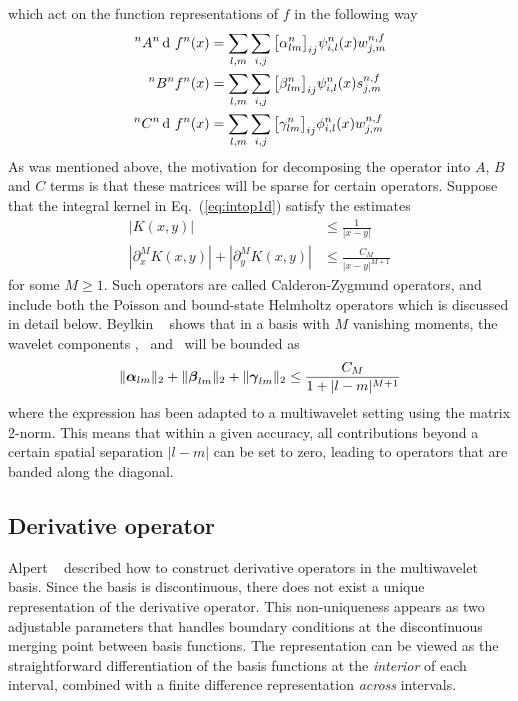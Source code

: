 which act on the function representations of $f$ in the following way
\begin{align}
    \label{eq:Aact}
    \A{n}{n}\waveletrep{f}{n}(x) &= \sum_{l,m} \sum_{i,j}
	\big[\alpha^n_{lm}\big]_{ij}
        \wavelet^n_{i,l}(x) 
	\waveletcoef^{n,f}_{j,m}\\
    \label{eq:Bact}
    \B{n}{n}\scalingrep{f}{n}(x) &= \sum_{l,m} \sum_{i,j}
	\big[\beta^n_{lm}\big]_{ij}
        \wavelet^n_{i,l}(x) 
	\scalingcoef^{n,f}_{j,m}\\
    \label{eq:Cact}
    \C{n}{n}\waveletrep{f}{n}(x) &= \sum_{l,m} \sum_{i,j}
	\big[\gamma^n_{lm}\big]_{ij}
        \scaling^n_{i,l}(x) 
	\waveletcoef^{n,f}_{j,m}
\end{align}
As was mentioned above, the motivation for decomposing the operator into $A$, $B$
and $C$ terms is that these matrices will be sparse for certain operators. Suppose 
that the integral kernel in Eq.~(\ref{eq:intop1d}) satisfy the estimates
\begin{align}
    |K(x,y)| &\leq \frac{1}{|x-y|}\\
    |\partial_x^M K(x,y)|+ |\partial_y^M K(x,y)| &\leq \frac{C_M}{|x-y|^{M+1}}
\end{align}
for some $M\geq1$. Such operators are called Calderon-Zygmund operators, and
include both the Poisson and bound-state Helmholtz operators which is discussed 
in detail below. Beylkin \etal~\cite{Beylkin:1991} 
shows that in a basis with $M$ vanishing moments, the wavelet 
components \alphamat, \betamat\ and \gammamat\ will be bounded as
\begin{equation}
    \label{eq:operbandwidth}
    \|\boldsymbol{\alpha}_{lm}\|_2 + \|\boldsymbol{\beta}_{lm}\|_2 + \|\boldsymbol{\gamma}_{lm}\|_2 
	\leq \frac{C_M}{1+|l-m|^{M+1}}
\end{equation}
where the expression has been adapted to a multiwavelet setting using the matrix
2-norm. This means that within a given accuracy, all contributions beyond a certain 
spatial separation $|l-m|$ can be set to zero, leading to operators that are 
banded along the diagonal.

\subsection{Derivative operator}\label{sec:diff_oper}
Alpert \etal~\cite{Alpert:2002p149} described how to construct derivative operators in
the multiwavelet basis. Since the basis is discontinuous, there does not exist a
unique representation of the derivative operator. This non-uniqueness
appears as two adjustable parameters that handles boundary conditions at the
discontinuous merging point between basis functions. The representation can be
viewed as the straightforward differentiation of the basis functions at the 
\emph{interior} of each interval, combined with a finite difference representation
\emph{across} intervals.

